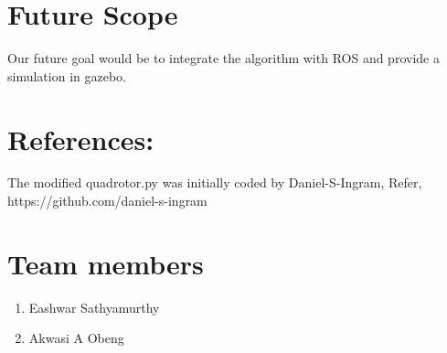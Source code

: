 \documentclass{IEEEtran}
\begin{document}
\section{\textbf{Future Scope}}
Our future goal would be to integrate the algorithm with ROS and provide a simulation in gazebo. 
\section{References:}
The modified quadrotor.py was initially coded by Daniel-S-Ingram, Refer,
https://github.com/daniel-s-ingram

\section{Team members}
\begin{enumerate}
\item Eashwar Sathyamurthy
\item Akwasi A Obeng
\end{enumerate}
\end{document}
